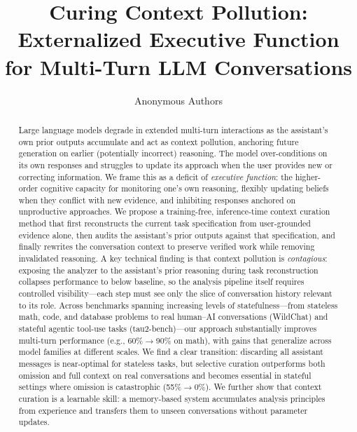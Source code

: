 \documentclass{article} %
\title{Curing Context Pollution: Externalized Executive Function\\for Multi-Turn LLM Conversations}
\author{Anonymous Authors}
\begin{document}
\ifcolmsubmission
\linenumbers
\fi

\maketitle

\begin{abstract}
Large language models degrade in extended multi-turn interactions as the assistant's own prior outputs accumulate and act as context pollution, anchoring future generation on earlier (potentially incorrect) reasoning. The model over-conditions on its own responses and struggles to update its approach when the user provides new or correcting information. We frame this as a deficit of \emph{executive function}: the higher-order cognitive capacity for monitoring one's own reasoning, flexibly updating beliefs when they conflict with new evidence, and inhibiting responses anchored on unproductive approaches. We propose a training-free, inference-time context curation method that first reconstructs the current task specification from user-grounded evidence alone, then audits the assistant's prior outputs against that specification, and finally rewrites the conversation context to preserve verified work while removing invalidated reasoning. A key technical finding is that context pollution is \emph{contagious}: exposing the analyzer to the assistant's prior reasoning during task reconstruction collapses performance to below baseline, so the analysis pipeline itself requires controlled visibility---each step must see only the slice of conversation history relevant to its role. Across benchmarks spanning increasing levels of statefulness---from stateless math, code, and database problems to real human--AI conversations (WildChat) and stateful agentic tool-use tasks (tau2-bench)---our approach substantially improves multi-turn performance (e.g., 60\%$\to$90\% on math), with gains that generalize across model families at different scales. We find a clear transition: discarding all assistant messages is near-optimal for stateless tasks, but selective curation outperforms both omission and full context on real conversations and becomes essential in stateful settings where omission is catastrophic (55\%$\to$0\%). We further show that context curation is a learnable skill: a memory-based system accumulates analysis principles from experience and transfers them to unseen conversations without parameter updates.
\end{abstract}


\end{document}

